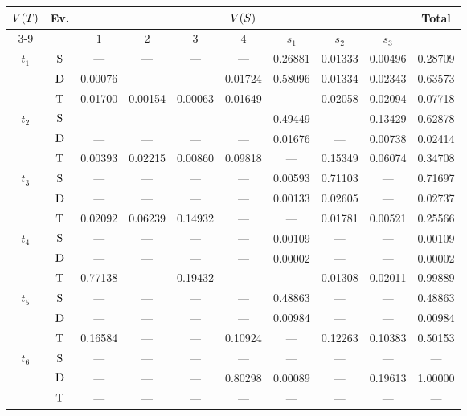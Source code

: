 \begin{tabular}{cccccccccc}
\toprule
\multirow{2}{*}[-2pt]{\(V(T)\)} &
\multirow{2}{*}[-2pt]{Ev.} &
\multicolumn{7}{c}{\(V(S)\)} &
\multirow{2}{*}[-2pt]{Total} \\
\cmidrule(lr){3-9}
&& \(1\) & \(2\) & \(3\) & \(4\) & \(s_1\) & \(s_2\) & \(s_3\) & \\
\midrule
\multirow{3}{*}{\(t_1\)} & \(\mathrm{S}\) & --- & --- & --- & --- & 0.26881 & 0.01333 & 0.00496 & 0.28709 \\
& \(\mathrm{D}\) & 0.00076 & --- & --- & 0.01724 & 0.58096 & 0.01334 & 0.02343 & 0.63573 \\
& \(\mathrm{T}\) & 0.01700 & 0.00154 & 0.00063 & 0.01649 & --- & 0.02058 & 0.02094 & 0.07718 \\
\midrule
\multirow{3}{*}{\(t_2\)} & \(\mathrm{S}\) & --- & --- & --- & --- & 0.49449 & --- & 0.13429 & 0.62878 \\
& \(\mathrm{D}\) & --- & --- & --- & --- & 0.01676 & --- & 0.00738 & 0.02414 \\
& \(\mathrm{T}\) & 0.00393 & 0.02215 & 0.00860 & 0.09818 & --- & 0.15349 & 0.06074 & 0.34708 \\
\midrule
\multirow{3}{*}{\(t_3\)} & \(\mathrm{S}\) & --- & --- & --- & --- & 0.00593 & 0.71103 & --- & 0.71697 \\
& \(\mathrm{D}\) & --- & --- & --- & --- & 0.00133 & 0.02605 & --- & 0.02737 \\
& \(\mathrm{T}\) & 0.02092 & 0.06239 & 0.14932 & --- & --- & 0.01781 & 0.00521 & 0.25566 \\
\midrule
\multirow{3}{*}{\(t_4\)} & \(\mathrm{S}\) & --- & --- & --- & --- & 0.00109 & --- & --- & 0.00109 \\
& \(\mathrm{D}\) & --- & --- & --- & --- & 0.00002 & --- & --- & 0.00002 \\
& \(\mathrm{T}\) & 0.77138 & --- & 0.19432 & --- & --- & 0.01308 & 0.02011 & 0.99889 \\
\midrule
\multirow{3}{*}{\(t_5\)} & \(\mathrm{S}\) & --- & --- & --- & --- & 0.48863 & --- & --- & 0.48863 \\
& \(\mathrm{D}\) & --- & --- & --- & --- & 0.00984 & --- & --- & 0.00984 \\
& \(\mathrm{T}\) & 0.16584 & --- & --- & 0.10924 & --- & 0.12263 & 0.10383 & 0.50153 \\
\midrule
\multirow{3}{*}{\(t_6\)} & \(\mathrm{S}\) & --- & --- & --- & --- & --- & --- & --- & --- \\
& \(\mathrm{D}\) & --- & --- & --- & 0.80298 & 0.00089 & --- & 0.19613 & 1.00000 \\
& \(\mathrm{T}\) & --- & --- & --- & --- & --- & --- & --- & --- \\
\bottomrule
\end{tabular}

